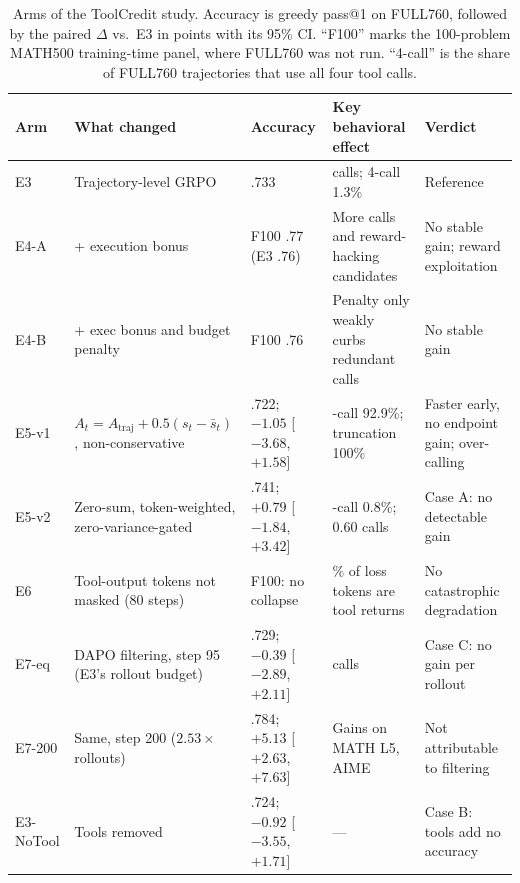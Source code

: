 \begin{table}[t]
\centering
\small
\caption{Arms of the ToolCredit study. Accuracy is greedy pass@1 on FULL760, followed by the paired $\Delta$ vs.\ E3 in points with its 95\% CI. ``F100'' marks the 100-problem MATH500 training-time panel, where FULL760 was not run. ``4-call'' is the share of FULL760 trajectories that use all four tool calls.}
\label{tab:toolcredit}
\setlength{\tabcolsep}{3pt}
\renewcommand{\arraystretch}{1.1}
\begin{tabularx}{\linewidth}{@{}l>{\raggedright\arraybackslash}X>{\raggedright\arraybackslash}p{2.2cm}>{\raggedright\arraybackslash}X>{\raggedright\arraybackslash}X@{}}
\toprule
Arm & What changed & Accuracy & Key behavioral effect & Verdict \\
\midrule
E3 & Trajectory-level GRPO & .733 & 0.89 calls; 4-call 1.3\% & Reference \\
E4-A & + execution bonus & F100 .77 (E3 .76) & More calls and reward-hacking candidates & No stable gain; reward exploitation \\
E4-B & + exec bonus and budget penalty & F100 .76 & Penalty only weakly curbs redundant calls & No stable gain \\
E5-v1 & $A_t{=}A_{\text{traj}}{+}0.5(s_t{-}\bar s_t)$, non-conservative & .722; $-1.05$ [$-3.68$, $+1.58$] & 4-call 92.9\%; truncation 100\% & Faster early, no endpoint gain; over-calling \\
E5-v2 & Zero-sum, token-weighted, zero-variance-gated & .741; $+0.79$ [$-1.84$, $+3.42$] & 4-call 0.8\%; 0.60 calls & Case A: no detectable gain \\
E6 & Tool-output tokens not masked (80 steps) & F100: no collapse & 4.66\% of loss tokens are tool returns & No catastrophic degradation \\
E7-eq & DAPO filtering, step 95 (E3's rollout budget) & .729; $-0.39$ [$-2.89$, $+2.11$] & 0.63 calls & Case C: no gain per rollout \\
E7-200 & Same, step 200 ($2.53\times$ rollouts) & .784; $+5.13$ [$+2.63$, $+7.63$] & Gains on MATH L5, AIME & Not attributable to filtering \\
E3-NoTool & Tools removed & .724; $-0.92$ [$-3.55$, $+1.71$] & --- & Case B: tools add no accuracy \\
\bottomrule
\end{tabularx}
\end{table}

